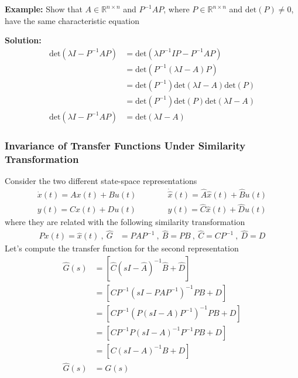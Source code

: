 \documentclass[twoside]{article}
\begin{document}
\vspace{6pt}

\textbf{Example:} Show that $A \in \mathbb{R}^{n \times n}$ and $P^{-1} A
P$, where $P \in \mathbb{R}^{n \times n}$ and $\mathrm{det}(P) \neq 0$, have the
same characteristic equation

\textbf{Solution:} 
\begin{align*}
  \mathrm{det}\left(\lambda I - P^{-1} A P \right) &= 
\mathrm{det}\left( \lambda P^{-1} I P - P^{-1} A P \right)
\\
&= \mathrm{det} \left( P^{-1} \left( \lambda I - A \right) P \right)
\\
&= \mathrm{det} \left( P^{-1} \right)
\mathrm{det} \left( \lambda I - A \right) 
\mathrm{det} \left( P \right)
\\
&= \mathrm{det} \left( P^{-1} \right) \mathrm{det} \left( P \right)
\mathrm{det} \left( \lambda I - A \right) 
\\
\mathrm{det}\left(\lambda I - P^{-1} A P \right) &= \mathrm{det} \left( \lambda I - A \right) 
\end{align*}

\subsubsection{Invariance of Transfer Functions Under Similarity
  Transformation}

Consider the two different state-space representations
%
\begin{align*}
  \dot{x}(t) = A x(t) + B u(t)  \quad & \quad \quad \dot{\hat{x}}(t) = \hat{A} \hat{x}(t) + \hat{B} u(t) 
\\
  y(t) = C x(t) + D u(t) \quad & \quad \quad  y(t) = \hat{C} \hat{x}(t) + \hat{D} u(t)
\end{align*}
%
where they are related with the following similarity transformation
%
\begin{align*}
P x(t) = \hat{x}(t) \ , \
\hat{G} &= P  A P^{-1} \ , \ \hat{B} = P  B \ , \ \hat{C} = C P^{-1} \ ,
  \ \hat{D} = D
\end{align*}
%
Let's compute the transfer function for the second representation
%
\begin{align*}
  \hat{G}(s) &= \left[ \hat{C} \left(s I - \hat{A} \right)^{-1} \hat{B}
  + \hat{D} \right]
\\
&= \left[ C P^{-1} \left(s I - P  A P^{-1} \right)^{-1} P B
  + D \right]
\\
&= \left[ C P^{-1} \left( P \left( s I -   A \right) P^{-1} \right)^{-1} P B
  + D \right]
\\
&= \left[ C P^{-1} P \left( s I -   A \right)^{-1} P^{-1} P B
  + D \right]
\\
&= \left[ C \left( s I -   A \right)^{-1} B + D \right]
\\
\hat{G}(s) &= G(s)
\end{align*}
\end{document}
